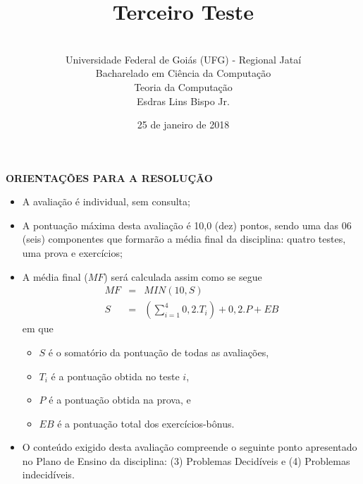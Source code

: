 \documentclass[12pt,a4paper,oneside]{article}
\author{\\Universidade Federal de Goiás (UFG) - Regional  Jataí\\Bacharelado em Ciência da Computação \\Teoria da Computação \\Esdras Lins Bispo Jr.}
\date{25 de janeiro de 2018}
\title{\sc \huge Terceiro Teste}
\begin{document}
\maketitle

{\bf ORIENTAÇÕES PARA A RESOLUÇÃO}

\small
 
\begin{itemize}
	\item A avaliação é individual, sem consulta;
	\item A pontuação máxima desta avaliação é 10,0 (dez) pontos, sendo uma das 06 (seis) componentes que formarão a média final da disciplina: quatro testes, uma prova e exercícios;
	\item A média final ($MF$) será calculada assim como se segue
	\begin{eqnarray}
		MF & = & MIN(10, S) \nonumber \\
		S & = & (\sum_{i=1}^{4} 0,2.T_i ) + 0,2.P  + EB\nonumber
	\end{eqnarray}
	em que 
	\begin{itemize}
		\item $S$ é o somatório da pontuação de todas as avaliações,
		\item $T_i$ é a pontuação obtida no teste $i$,
		\item $P$ é a pontuação obtida na prova, e
		\item $EB$ é a pontuação total dos exercícios-bônus.
	\end{itemize}
	\item O conteúdo exigido desta avaliação compreende o seguinte ponto apresentado no Plano de Ensino da disciplina: (3) Problemas Decidíveis e (4) Problemas indecidíveis.
\end{itemize}

\begin{center}
\end{center}

\newpage
\end{document}
